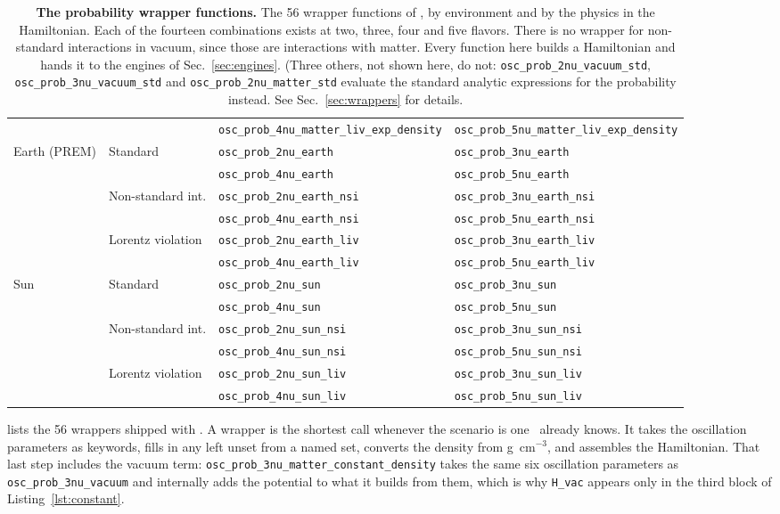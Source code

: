 {\begin{table}[t!]
{\begin{tabular}{@{}p{2.7cm}p{2.5cm}p{5.9cm}p{5.9cm}@{}}
  &  & {\tt osc\_prob\_4nu\_matter\_liv\_exp\_density} & {\tt osc\_prob\_5nu\_matter\_liv\_exp\_density} \\
 Earth (PREM) & Standard & {\tt osc\_prob\_2nu\_earth} & {\tt osc\_prob\_3nu\_earth} \\
  &  & {\tt osc\_prob\_4nu\_earth} & {\tt osc\_prob\_5nu\_earth} \\
  & Non-standard int. & {\tt osc\_prob\_2nu\_earth\_nsi} & {\tt osc\_prob\_3nu\_earth\_nsi} \\
  &  & {\tt osc\_prob\_4nu\_earth\_nsi} & {\tt osc\_prob\_5nu\_earth\_nsi} \\
  & Lorentz violation & {\tt osc\_prob\_2nu\_earth\_liv} & {\tt osc\_prob\_3nu\_earth\_liv} \\
  &  & {\tt osc\_prob\_4nu\_earth\_liv} & {\tt osc\_prob\_5nu\_earth\_liv} \\
 Sun & Standard & {\tt osc\_prob\_2nu\_sun} & {\tt osc\_prob\_3nu\_sun} \\
  &  & {\tt osc\_prob\_4nu\_sun} & {\tt osc\_prob\_5nu\_sun} \\
  & Non-standard int. & {\tt osc\_prob\_2nu\_sun\_nsi} & {\tt osc\_prob\_3nu\_sun\_nsi} \\
  &  & {\tt osc\_prob\_4nu\_sun\_nsi} & {\tt osc\_prob\_5nu\_sun\_nsi} \\
  & Lorentz violation & {\tt osc\_prob\_2nu\_sun\_liv} & {\tt osc\_prob\_3nu\_sun\_liv} \\
  &  & {\tt osc\_prob\_4nu\_sun\_liv} & {\tt osc\_prob\_5nu\_sun\_liv} \\
\end{tabular}}
\caption{\label{tab:wrappers}\textbf{The probability wrapper functions.} The 56 wrapper functions of \magnus, by environment and by the physics in the Hamiltonian. Each of the fourteen combinations exists at two, three, four and five flavors. There is no wrapper for non-standard interactions in vacuum, since those are interactions with matter. Every function here builds a Hamiltonian and hands it to the engines of Sec.~\ref{sec:engines}. (Three others, not shown here, do not: {\tt osc\_prob\_2nu\_vacuum\_std}, {\tt osc\_prob\_3nu\_vacuum\_std} and {\tt osc\_prob\_2nu\_matter\_std} evaluate the standard analytic expressions for the probability instead. See Sec.~\ref{sec:wrappers} for details.}
\end{table}}

 lists the 56 wrappers shipped with \magnus. A wrapper is the shortest call whenever the scenario is one \magnus\ already knows. It takes the oscillation parameters as keywords, fills in any left unset from a named set, converts the density from g~cm$^{-3}$, and assembles the Hamiltonian. That last step includes the vacuum term: {\tt osc\_prob\_3nu\_matter\_constant\_density} takes the same six oscillation parameters as {\tt osc\_prob\_3nu\_vacuum} and internally adds the potential to what it builds from them, which is why {\tt H\_vac} appears only in the third block of Listing~\ref{lst:constant}.

